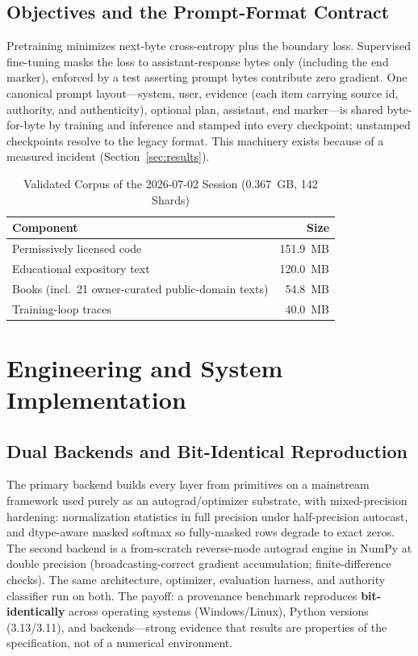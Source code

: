 \documentclass[journal]{IEEEtran}
\begin{document}
\subsection{Objectives and the Prompt-Format Contract}
Pretraining minimizes next-byte cross-entropy plus the boundary loss. Supervised fine-tuning masks the loss to assistant-response bytes only (including the end marker), enforced by a test asserting prompt bytes contribute zero gradient. One canonical prompt layout---system, user, evidence (each item carrying source id, authority, and authenticity), optional plan, assistant, end marker---is shared byte-for-byte by training and inference and stamped into every checkpoint; unstamped checkpoints resolve to the legacy format. This machinery exists because of a measured incident (Section~\ref{sec:results}).

\begin{table}[!t]
\caption{Validated Corpus of the 2026-07-02 Session (0.367~GB, 142 Shards)}
\label{tab:corpus}
\centering
\begin{tabular}{lr}
\toprule
Component & Size \\
\midrule
Permissively licensed code & 151.9~MB \\
Educational expository text & 120.0~MB \\
Books (incl.\ 21 owner-curated public-domain texts) & 54.8~MB \\
Training-loop traces & 40.0~MB \\
\bottomrule
\end{tabular}
\end{table}

\section{Engineering and System Implementation}
\label{sec:engineering}

\subsection{Dual Backends and Bit-Identical Reproduction}
The primary backend builds every layer from primitives on a mainstream framework used purely as an autograd/optimizer substrate, with mixed-precision hardening: normalization statistics in full precision under half-precision autocast, and dtype-aware masked softmax so fully-masked rows degrade to exact zeros. The second backend is a from-scratch reverse-mode autograd engine in NumPy at double precision (broadcasting-correct gradient accumulation; finite-difference checks). The same architecture, optimizer, evaluation harness, and authority classifier run on both. The payoff: a provenance benchmark reproduces \textbf{bit-identically} across operating systems (Windows/Linux), Python versions (3.13/3.11), and backends---strong evidence that results are properties of the specification, not of a numerical environment.
\end{document}
